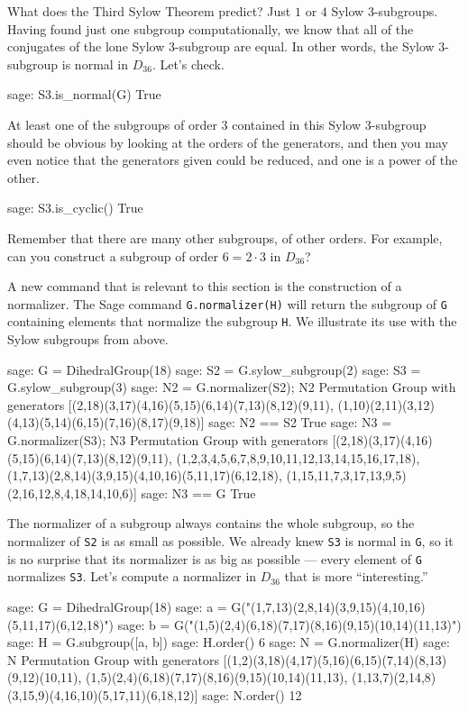 %
What does the Third Sylow Theorem predict?  Just $1$ or $4$ Sylow $3$-subgroups.  Having found just one subgroup computationally, we know that all of the conjugates of the lone Sylow $3$-subgroup are equal.  In other words, the Sylow $3$-subgroup is normal in $D_{36}$.  Let's check.
%
\begin{sageexample}
sage: S3.is_normal(G)
True
\end{sageexample}
%
At least one of the subgroups of order $3$ contained in this Sylow $3$-subgroup should be obvious by looking at the orders of the generators, and then you may even notice that the generators given could be reduced, and one is a power of the other.
%
\begin{sageexample}
sage: S3.is_cyclic()
True
\end{sageexample}
%
Remember that there are many other subgroups, of other orders.  For example, can you construct a subgroup of order $6=2\cdot 3$ in $D_{36}$?\par
%
%
A new command that is relevant to this section is the construction of a normalizer.  The Sage command \verb?G.normalizer(H)? will return the subgroup of \verb?G? containing elements that normalize the subgroup \verb?H?.  We illustrate its use with the Sylow subgroups from above.
%
\begin{sageexample}
sage: G = DihedralGroup(18)
sage: S2 = G.sylow_subgroup(2)
sage: S3 = G.sylow_subgroup(3)
sage: N2 = G.normalizer(S2); N2
Permutation Group with generators
  [(2,18)(3,17)(4,16)(5,15)(6,14)(7,13)(8,12)(9,11),
   (1,10)(2,11)(3,12)(4,13)(5,14)(6,15)(7,16)(8,17)(9,18)]
sage: N2 == S2
True
sage: N3 = G.normalizer(S3); N3
Permutation Group with generators
[(2,18)(3,17)(4,16)(5,15)(6,14)(7,13)(8,12)(9,11),
 (1,2,3,4,5,6,7,8,9,10,11,12,13,14,15,16,17,18),
 (1,7,13)(2,8,14)(3,9,15)(4,10,16)(5,11,17)(6,12,18),
 (1,15,11,7,3,17,13,9,5)(2,16,12,8,4,18,14,10,6)]
sage: N3 == G
True
\end{sageexample}
%
The normalizer of a subgroup always contains the whole subgroup, so the normalizer of \verb?S2? is as small as possible.  We already knew \verb?S3? is normal in \verb?G?, so it is no surprise that its normalizer is as big as possible --- every element of \verb?G? normalizes \verb?S3?.  Let's compute a normalizer in $D_{36}$ that is more ``interesting.''
%
\begin{sageexample}
sage: G = DihedralGroup(18)
sage: a = G("(1,7,13)(2,8,14)(3,9,15)(4,10,16)(5,11,17)(6,12,18)")
sage: b = G("(1,5)(2,4)(6,18)(7,17)(8,16)(9,15)(10,14)(11,13)")
sage: H = G.subgroup([a, b])
sage: H.order()
6
sage: N = G.normalizer(H)
sage: N
Permutation Group with generators
  [(1,2)(3,18)(4,17)(5,16)(6,15)(7,14)(8,13)(9,12)(10,11),
   (1,5)(2,4)(6,18)(7,17)(8,16)(9,15)(10,14)(11,13),
   (1,13,7)(2,14,8)(3,15,9)(4,16,10)(5,17,11)(6,18,12)]
sage: N.order()
12
\end{sageexample}
